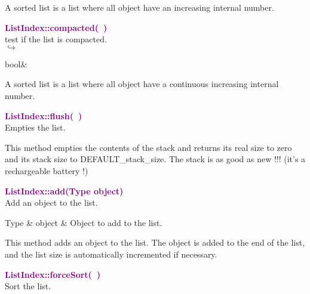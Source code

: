 A sorted list is a list where all object have an increasing internal number.

\textcolor{purple}{\textbf{ListIndex::compacted(~)}}\label{ListIndex::compacted()}\\
test if the list is compacted.\\ \hspace*{5mm}$\hookrightarrow$
\vspace*{-2em}\begin{tcolorbox}[grow to left by=-1cm, width=\textwidth-1cm,myArgs,tabularx={l|R}]
bool&
\end{tcolorbox}

A sorted list is a list where all object have a continuous increasing internal number.

\textcolor{purple}{\textbf{ListIndex::flush(~)}}\label{ListIndex::flush()}\\
Empties the list.

This method empties the contents of the stack and returns its real size to zero and its stack size to DEFAULT\_stack\_size.
The stack is as good as new !!! (it's a rechargeable battery !)

\textcolor{purple}{\textbf{ListIndex::add(Type object)}}\label{ListIndex::add(Type object)}\\
Add an object to the list.

\begin{tcolorbox}[width=\textwidth,myArgs,tabularx={ll|R}]
Type & object & Object to add to the list.
\end{tcolorbox}

This method adds an object to the list. The object is added to the end of the list, and the list size is automatically incremented if necessary.

\textcolor{purple}{\textbf{ListIndex::forceSort(~)}}\label{ListIndex::forceSort()}\\
Sort the list.

